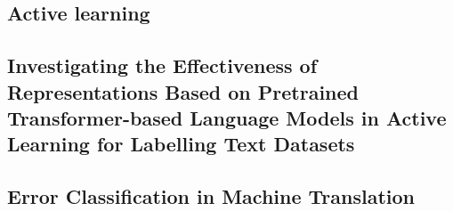 
\subsection{Active learning}
\label{active-learning-interactive}
  

\subsection{Investigating the Effectiveness of Representations Based on Pretrained 
Transformer-based Language Models in Active Learning for Labelling Text Datasets}
\label{investigating-effectiveness}


\subsection{Error Classification in Machine Translation}
\label{ssec:related_errors}




